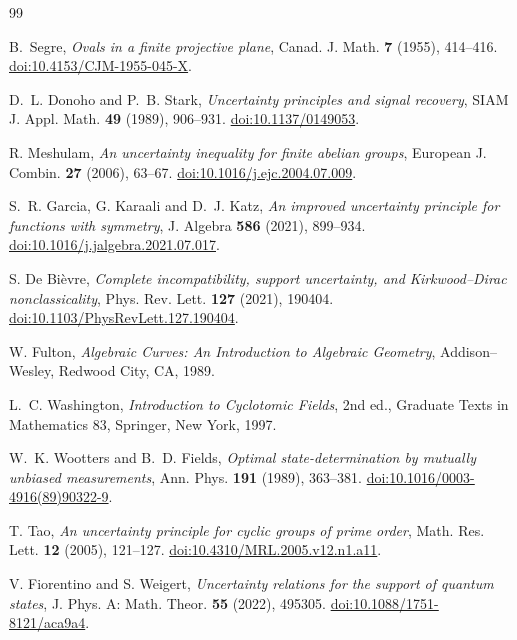 \documentclass[11pt]{article}
\begin{document}
\begin{thebibliography}{99}

B.~Segre,
\emph{Ovals in a finite projective plane},
Canad. J. Math. \textbf{7} (1955), 414--416.
\href{https://doi.org/10.4153/CJM-1955-045-X}
{doi:10.4153/CJM-1955-045-X}.



D.~L. Donoho and P.~B. Stark,
\emph{Uncertainty principles and signal recovery},
SIAM J. Appl. Math. \textbf{49} (1989), 906--931.
\href{https://doi.org/10.1137/0149053}{doi:10.1137/0149053}.

R. Meshulam,
\emph{An uncertainty inequality for finite abelian groups},
European J. Combin. \textbf{27} (2006), 63--67.
\href{https://doi.org/10.1016/j.ejc.2004.07.009}{doi:10.1016/j.ejc.2004.07.009}.

S.~R. Garcia, G. Karaali and D.~J. Katz,
\emph{An improved uncertainty principle for functions with symmetry},
J. Algebra \textbf{586} (2021), 899--934.
\href{https://doi.org/10.1016/j.jalgebra.2021.07.017}{doi:10.1016/j.jalgebra.2021.07.017}.

S. De Bi\`evre,
\emph{Complete incompatibility, support uncertainty, and
Kirkwood--Dirac nonclassicality},
Phys. Rev. Lett. \textbf{127} (2021), 190404.
\href{https://doi.org/10.1103/PhysRevLett.127.190404}{doi:10.1103/PhysRevLett.127.190404}.

W. Fulton,
\emph{Algebraic Curves: An Introduction to Algebraic Geometry},
Addison--Wesley, Redwood City, CA, 1989.

L.~C. Washington,
\emph{Introduction to Cyclotomic Fields}, 2nd ed.,
Graduate Texts in Mathematics 83, Springer, New York, 1997.

W.~K. Wootters and B.~D. Fields,
\emph{Optimal state-determination by mutually unbiased measurements},
Ann. Phys. \textbf{191} (1989), 363--381.
\href{https://doi.org/10.1016/0003-4916(89)90322-9}{doi:10.1016/0003-4916(89)90322-9}.

T. Tao,
\emph{An uncertainty principle for cyclic groups of prime order},
Math. Res. Lett. \textbf{12} (2005), 121--127.
\href{https://doi.org/10.4310/MRL.2005.v12.n1.a11}{doi:10.4310/MRL.2005.v12.n1.a11}.

V. Fiorentino and S. Weigert,
\emph{Uncertainty relations for the support of quantum states},
J. Phys. A: Math. Theor. \textbf{55} (2022), 495305.
\href{https://doi.org/10.1088/1751-8121/aca9a4}{doi:10.1088/1751-8121/aca9a4}.


\end{thebibliography}
\end{document}
